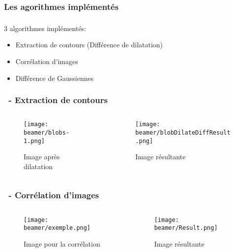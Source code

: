 \documentclass[11pt]{beamer}
\begin{document}
\subsubsection*{Les agorithmes implémentés}
\begin{frame}
\frametitle{\subsubsecname}
\begin{block}{3 algorithmes implémentés:}
\begin{itemize}
\item Extraction de contours (Différence de dilatation)
\item Corrélation d'images
\item Différence de Gaussiennes 
\end{itemize}
\end{block}
\end{frame}
\begin{frame}
\frametitle{\subsecname ~- Extraction de contours}
\begin{columns}
		\begin{column}{5cm}
			\begin{figure}
				\texttt{[image: beamer/blobs-1.png]}

				Image après dilatation
			\end{figure}
		\end{column}
		\begin{column}{5cm}

			\begin{figure}
				\texttt{[image: beamer/blobDilateDiffResult.png]}

				Image résultante
			\end{figure}
		\end{column}
	\end{columns}
\end{frame}
\begin{frame}
\frametitle{\subsecname ~- Corrélation d'images}
	\begin{columns}
		\begin{column}{5cm}
			\begin{figure}
				\texttt{[image: beamer/exemple.png]}

				Image pour la corrélation
			\end{figure}
		\end{column}
		\begin{column}{5cm}

			\begin{figure}
				\texttt{[image: beamer/Result.png]}

				Image résultante
			\end{figure}
		\end{column}
	\end{columns}
\end{frame}
\end{document}
